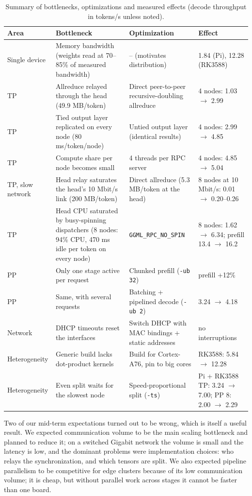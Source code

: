\documentclass[11pt,a4paper]{article}
\begin{document}
\begin{table}[H]
\centering
\caption{Summary of bottlenecks, optimizations and measured effects (decode throughput in tokens/s unless noted).}
\label{tab:summary}
\small
\begin{tabular}{@{}p{2.2cm}p{4.7cm}p{4.6cm}p{3.0cm}@{}}
\toprule
Area & Bottleneck & Optimization & Effect \\
\midrule
Single device & Memory bandwidth (weights read at 70--85\% of measured bandwidth) & -- (motivates distribution) & 1.84 (Pi), 12.28 (RK3588) \\
TP & Allreduce relayed through the head (49.9 MB/token) & Direct peer-to-peer recursive-doubling allreduce & 4 nodes: 1.03 $\rightarrow$ 2.99 \\
TP & Tied output layer replicated on every node (80 ms/token/node) & Untied output layer (identical results) & 4 nodes: 2.99 $\rightarrow$ 4.85 \\
TP & Compute share per node becomes small & 4 threads per RPC server & 4 nodes: 4.85 $\rightarrow$ 5.04 \\
TP, slow network & Head relay saturates the head's 10 Mbit/s link (200 MB/token) & Direct allreduce (5.3 MB/token at the head) & 8 nodes at 10 Mbit/s: 0.01 $\rightarrow$ 0.20--0.26 \\
TP & Head CPU saturated by busy-spinning dispatchers (8 nodes: 94\% CPU, 470 ms idle per token on every node) & \texttt{GGML\_RPC\_NO\_SPIN} & 8 nodes: 1.62 $\rightarrow$ 6.34; prefill 13.4 $\rightarrow$ 16.2 \\
PP & Only one stage active per request & Chunked prefill (\texttt{-ub 32}) & prefill +12\% \\
PP & Same, with several requests & Batching + pipelined decode (\texttt{-ub 2}) & 3.24 $\rightarrow$ 4.18 \\
Network & DHCP timeouts reset the interfaces & Switch DHCP with MAC bindings + static addresses & no interruptions \\
Heterogeneity & Generic build lacks dot-product kernels & Build for Cortex-A76, pin to big cores & RK3588: 5.84 $\rightarrow$ 12.28 \\
Heterogeneity & Even split waits for the slowest node & Speed-proportional split (\texttt{-ts}) & Pi + RK3588 TP: 3.24 $\rightarrow$ 7.00; PP 8: 2.00 $\rightarrow$ 2.29 \\
\bottomrule
\end{tabular}
\end{table}

Two of our mid-term expectations turned out to be wrong, which is itself a useful result. We expected communication volume to be the main scaling bottleneck and planned to reduce it; on a switched Gigabit network the volume is small and the latency is low, and the dominant problems were implementation choices: who relays the synchronization, and which tensors are split. We also expected pipeline parallelism to be competitive for edge clusters because of its low communication volume; it is cheap, but without parallel work across stages it cannot be faster than one board.
\end{document}
